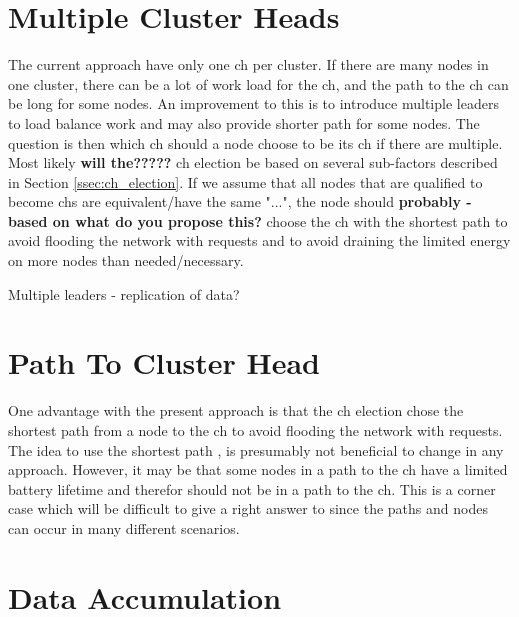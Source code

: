 \documentclass[USenglish]{uit-thesis}
\begin{document}


\section{Multiple Cluster Heads}
The current approach have only one \gls{ch} per cluster. If there are many nodes in one cluster, there can be a lot of work load for the \gls{ch}, and the path to the \gls{ch} can be long for some nodes.
An improvement to this is to introduce multiple leaders to load balance work and may also provide shorter path for some nodes. The question is then which \gls{ch} should a node choose to be its \gls{ch} if there are multiple. Most likely \textbf{will the?????} \gls{ch} election be based on several sub-factors described in Section \ref{ssec:ch_election}. If we assume that all nodes that are qualified to become \gls{ch}s are equivalent/have the same "...", the node should \textbf{probably - based on what do you propose this?} choose the \gls{ch} with the shortest path to avoid flooding the network with requests and to avoid draining the limited energy on more nodes than needed/necessary.

Multiple leaders - replication of data?

\section{Path To Cluster Head}
One advantage with the present approach is that the \gls{ch} election chose the shortest path from a node to the \gls{ch} to avoid flooding the network with requests. The idea to use the shortest path \cite{dijkstra}, is presumably not beneficial to change in any approach. However, it may be that some nodes in a path to the \gls{ch} have a limited battery lifetime and therefor should not be in a path to the \gls{ch}. This is a corner case which will be difficult to give a right answer to since the paths and nodes can occur in many different scenarios.



\section{Data Accumulation}
\end{document}
